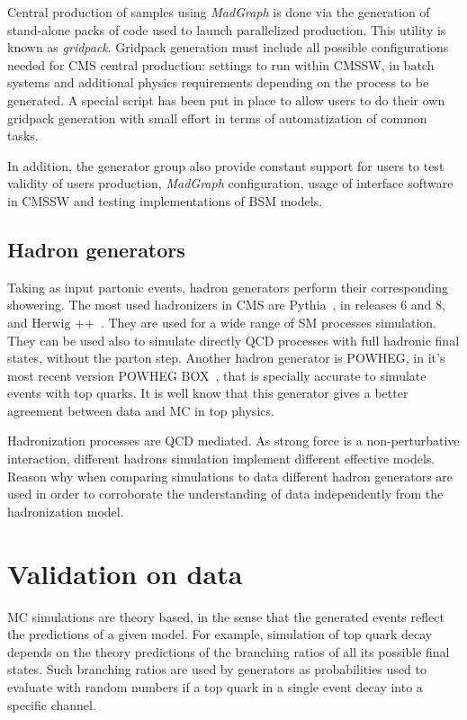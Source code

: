 Central production of samples using \textit{MadGraph} is done via the generation of stand-alone packs of code used to launch parallelized production. This utility is known as \textit{gridpack}. Gridpack generation must include all possible configurations needed for CMS central production: settings to run within CMSSW, in batch systems and additional physics requirements depending on the process to be generated. A special script has been put in place to allow users to do their own gridpack generation with small effort in terms of automatization of common tasks.

In addition, the generator group also provide constant support for users to test validity of users production, \textit{MadGraph} configuration, usage of interface software in CMSSW and testing implementations of BSM models.

\subsection{Hadron generators}
\label{sec:Had}

Taking as input partonic events, hadron generators perform their corresponding showering. The most used hadronizers in CMS are Pythia~\cite{Sjostrand:2006za}, in releases 6 and 8, and Herwig ++~\cite{Bahr:2008pv}. They are used for a wide range of SM processes simulation. They can be used also to simulate directly QCD processes with full hadronic final states, without the parton step. Another hadron generator is POWHEG, in it's most recent version POWHEG BOX~\cite{Nason:2004rx, Frixione:2007vw, Alioli:2010xd}, that is specially accurate to simulate events with top quarks. It is well know that this generator gives a better agreement between data and MC in top physics.

Hadronization processes are QCD mediated. As strong force is a non-perturbative interaction, different hadrons simulation implement different effective models. Reason why when comparing simulations to data different hadron generators are used in order to corroborate the understanding of data independently from the hadronization model. 

\section{Validation on data}
\label{sec:val}

MC simulations are theory based, in the sense that the generated events reflect the predictions of a given model. For example, simulation of top quark decay depends on the theory predictions of the branching ratios of all its possible final states. Such branching ratios are used by generators as probabilities used to evaluate with random numbers if a top quark in a single event decay into a specific channel. 

